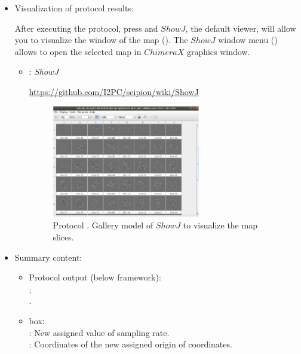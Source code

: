 \begin{itemize}
  \item Visualization of protocol results:
  
  After executing the protocol, press  and $ShowJ$, the default \scipion viewer, will allow you to visualize the  window of the map  (). The $ShowJ$ window menu () allows to open the selected map in $ChimeraX$ graphics window.
   
   \begin{itemize}
  \item {}: $ShowJ$
   
\url{https://github.com/I2PC/scipion/wiki/ShowJ}


   \begin{figure}[H]
   \centering 
    \captionsetup{width=.9\linewidth} 
    \includegraphics[width=0.65\textwidth]{Images_appendix/Fig302.pdf}
    \caption{Protocol . Gallery model of $ShowJ$ to visualize the map slices.}
    \label{fig:app_protocol_assign_orig_and_sampling_2}
   \end{figure}
   
   \end{itemize}
   
   \item Summary content:
    
    \begin{itemize}
     \item Protocol output (below \scipion framework):\\ ;\\ .
     \item {} box:\\: New assigned value of sampling rate.\\: Coordinates  of the new assigned origin of coordinates.
    \end{itemize}
  
  \end{itemize}
